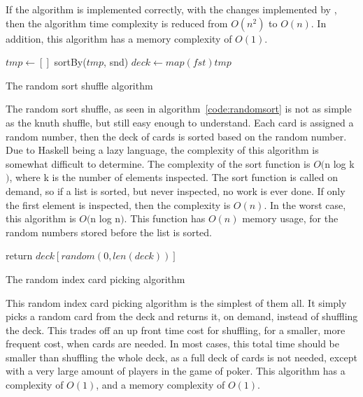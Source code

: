If the algorithm is implemented correctly, with the changes implemented by
\parencite{richard1964}, then the algorithm time complexity is reduced from
$O(n^2)$ to $O(n)$. In addition, this algorithm has a memory complexity of
$O(1)$.

\vspace{0.3cm}

\begin{algorithm}[H]
    \BlankLine{}
     $tmp \leftarrow []$\;
     
     sortBy($tmp$, snd)\;
     $deck \leftarrow map (fst) tmp$\;
\caption{The random sort shuffle algorithm}
\label{code:randomsort}
\end{algorithm}

\vspace{0.3cm}

The random sort shuffle, as seen in algorithm~\ref{code:randomsort} is not as
simple as the knuth shuffle, but still easy enough to understand. Each card
is assigned a random number, then the deck of cards is sorted based on the
random number. Due to Haskell being a lazy language, the complexity of this
algorithm is somewhat difficult to determine. The complexity of the sort
function is $O($n log k$)$, where k is the number of elements inspected. The
sort function is called on demand, so if a list is sorted, but never inspected,
no work is ever done. If only the first element is inspected, then the
complexity is $O(n)$. In the worst case, this algorithm is $O($n log n$)$.
This function has $O(n)$ memory usage, for the random numbers stored before
the list is sorted.

\vspace{0.3cm}

\begin{algorithm}[H]
    \BlankLine{}
     return $deck[random(0, len(deck))]$\;
\caption{The random index card picking algorithm}
\label{code:randomsort}
\end{algorithm}

\vspace{0.3cm}

This random index card picking algorithm is the simplest of them all. It simply
picks a random card from the deck and returns it, on demand, instead of
shuffling the deck. This trades off an up front time cost for shuffling, for
a smaller, more frequent cost, when cards are needed. In most cases, this
total time should be smaller than shuffling the whole deck, as a full deck
of cards is not needed, except with a very large amount of players in the game
of poker. This algorithm has a complexity of $O(1)$, and a memory complexity
of $O(1)$.

